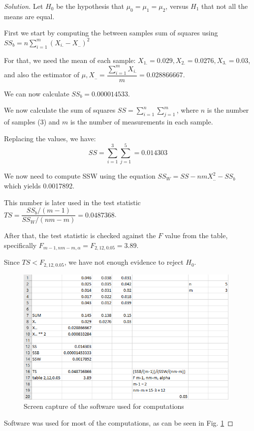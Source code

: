 \documentclass[titlepage, letterpaper, fleqn]{article}
\renewcommand\qedsymbol{\(\blacksquare\)}
\newenvironment{solution}
{\renewcommand\qedsymbol{$\square$}\begin{proof}[Solution]}
{\end{proof}}
\begin{document}
\begin{solution}
Let $H_0$ be the hypothesis that $\mu_0 = \mu_1 = \mu_2$,
versus $H_1$ that not all the means are equal.

First we start by computing the between samples sum of squares using $SS_b = n\sum\limits_{i=1}^m(X_{i.} - X_{..})^2$

For that, we need the mean of each sample: $X_{1.} = 0.029, X_{2.} = 0.0276, X_{3.} = 0.03$, and also  the estimator of $\mu, X_{..} = \dfrac{\sum\limits_{i=1}^m X_{i.}}{m} = 0.028866667$.

We can now calculate $SS_b = 0.000014533$.

We now calculate the sum of squares $SS = \sum\limits_{i=1}^n\sum\limits_{j=1}^m$, where $n$ is the number of samples (3) and $m$ is the number of measurements in each sample.

Replacing the values, we have:
\[SS = \sum\limits_{i=1}^3\sum\limits_{j=1}^5 = 0.014303\]

We now need to compute SSW using the equation $SS_W = SS - nmX_{..}^2 - SS_b$ which yields 0.0017892.

This number is later used in the test statistic $TS = \dfrac{SS_b / (m-1)}{SS_W/(nm-m)} = 0.0487368$.

After that, the test statistic is checked against the $F$ value from the table, specifically $F_{m-1,nm-m,\alpha} = F_{2,12,0.05} = 3.89$.

Since $TS < F_{2,12,0.05}$, we have not enough evidence to reject $H_0$.

\begin{figure}[htbp]
	\centering
	\includegraphics[width=0.98\textwidth]{img_4_6_1}
	\caption{Screen capture of the software used for computations}
	\label{fig:4.6.1}
\end{figure}

Software was used for most of the computations, as can be seen in Fig. \ref{fig:4.6.1}
\end{solution}
\end{document}
